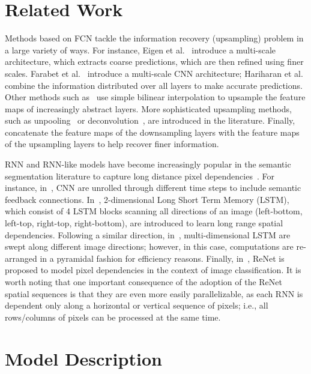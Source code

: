 \documentclass[times,art10,twocolumn,latex8]{article}
\begin{document}
\section{Related Work}

Methods based on FCN tackle the information recovery (upsampling) problem in a
large variety of ways. For instance, Eigen et al.~\cite{Eigen2015} introduce a
multi-scale architecture, which extracts coarse predictions, which are then
refined using finer scales. Farabet et al.~\cite{Farabet:2013} introduce a
multi-scale CNN architecture; Hariharan et al.~\cite{Hariharan2015} combine the
information distributed over all layers to make accurate predictions. Other
methods such as~\cite{long2014fully,badrinarayanan2015segnet} use simple
bilinear interpolation to upsample the feature maps of increasingly abstract
layers. More sophisticated upsampling methods, such as
unpooling~\cite{badrinarayanan2015segnet,noh2015learning} or
deconvolution~\cite{long2014fully}, are introduced in the literature. Finally,
\cite{Ronneberger2015} concatenate the feature maps of the downsampling layers
with the feature maps of the upsampling layers to help recover finer
information.

RNN and RNN-like models have become increasingly popular in the semantic
segmentation literature to capture long distance pixel
dependencies~\cite{Pinheiro:2014, Gatta14-deepvision,
byeon2015scene,stollenga2015parallel}. For instance, in~\cite{Pinheiro:2014,
Gatta14-deepvision}, CNN are unrolled through different time steps to include
semantic feedback connections. In~\cite{byeon2015scene}, 2-dimensional Long
Short Term Memory (LSTM), which consist of 4 LSTM blocks
scanning all directions of an image (left-bottom, left-top, right-top, right-bottom),
are introduced to learn long range spatial dependencies. Following a similar direction,
in~\cite{stollenga2015parallel}, multi-dimensional LSTM are swept along
different image directions; however, in this case, computations are re-arranged
in a pyramidal fashion for efficiency reasons. Finally,
in~\cite{visin2015renet}, ReNet is proposed to model pixel dependencies in the
context of image classification. It is worth noting that one important
consequence of the adoption of the ReNet spatial sequences is that they are
even more easily parallelizable, as each RNN is dependent only along a horizontal or
vertical sequence of pixels; i.e., all rows/columns of pixels can be processed
at the same time.



\section{Model Description}
\end{document}
